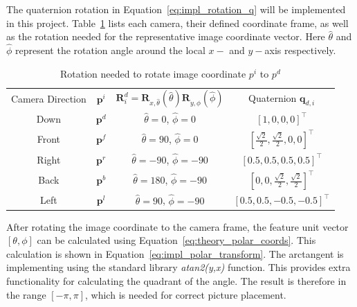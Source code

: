 The quaternion rotation in Equation~\eqref{eq:impl_rotation_q} will be implemented in this project. Table~\ref{tab:impl_quaternion_rotations} lists each camera, their defined coordinate frame, as well as the rotation needed for the representative image coordinate vector. Here $\hat{\theta}$ and $\hat{\phi}$ represent the rotation angle around the local $x-$ and $y-$axis respectively.

\begin{table}[!htb]
    \centering
    \begin{tabular}{|c|c|c|c|} \hline
        \multirow{2}{*}{Camera Direction} & \multirow{2}{*}{ $\mathbf{p}^i$} & \multirow{2}{*}{$\mathbf{R}^d_i = \mathbf{R}_{x,\hat{\theta}}(\hat{\theta})\mathbf{R}_{y,\hat{\phi}}(\hat{\phi})$} & \multirow{2}{*}{Quaternion $\mathbf{q}_{d,i}$} \\ &&& \\ \hline \hline
        \multirow{2}{*}{Down} & \multirow{2}{*}{$\mathbf{p}^d$} & \multirow{2}{*}{$\hat{\theta} = 0$, $\hat{\phi} = 0$} & \multirow{2}{*}{$[1,0,0,0]^\top$} \\ &&& \\ \hline
        \multirow{2}{*}{Front} & \multirow{2}{*}{$\mathbf{p}^f$} & \multirow{2}{*}{$\hat{\theta} = 90$, $\hat{\phi} = 0$} & \multirow{2}{*}{$\left[\frac{\sqrt{2}}{2},\frac{\sqrt{2}}{2},0,0\right]^\top$} \\ &&& \\ \hline
        \multirow{2}{*}{Right} & \multirow{2}{*}{$\mathbf{p}^r$} & \multirow{2}{*}{$\hat{\theta} = -90$, $\hat{\phi} = -90$} & \multirow{2}{*}{$[0.5,0.5,0.5,0.5]^\top$} \\ &&& \\ \hline
        \multirow{2}{*}{Back} & \multirow{2}{*}{$\mathbf{p}^b$} & \multirow{2}{*}{$\hat{\theta} = 180$, $\hat{\phi} = -90$} & \multirow{2}{*}{$\left[0,0,\frac{\sqrt{2}}{2},\frac{\sqrt{2}}{2}\right]^\top$} \\ &&& \\ \hline
        \multirow{2}{*}{Left} & \multirow{2}{*}{$\mathbf{p}^l$} & \multirow{2}{*}{$\hat{\theta} = 90$, $\hat{\phi} = -90$} & \multirow{2}{*}{$\left[0.5,0.5,-0.5,-0.5\right]^\top$} \\ &&& \\ \hline
    \end{tabular}
    \caption{Rotation needed to rotate image coordinate $p^i$ to $p^d$}
    \label{tab:impl_quaternion_rotations}
\end{table}

After rotating the image coordinate to the camera frame, the feature unit vector $[\theta, \phi]$ can be calculated using Equation~\eqref{eq:theory_polar_coords}. This calculation is shown in Equation~\eqref{eq:impl_polar_transform}. The arctangent is implementing using the standard library \emph{atan2(y,x)} function. This provides extra functionality for calculating the quadrant of the angle. The result is therefore in the range $[-\pi,\pi]$, which is needed for correct picture placement.

